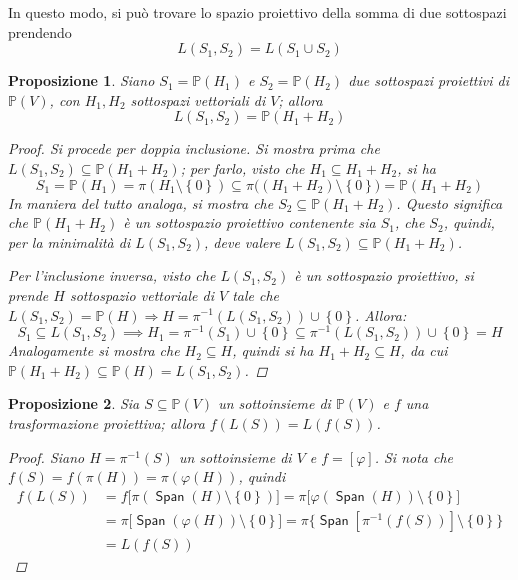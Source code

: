\documentclass[11pt, a4paper]{scrartcl}
\theoremstyle{style1}
\newtheorem{prop}{Proposizione}[section]
\numberwithin{equation}{subsection}
\renewcommand{\operatorname}[1]{\mathop{\mathrm{\textsf{#1}}}}
\begin{document}
In questo modo, si pu\`o trovare lo spazio proiettivo della somma di due sottospazi prendendo 
\begin{equation}
	L(S_1,S_2) = L(S_1\cup S_2)
\end{equation}
\begin{prop}
	Siano $S_1 = \mathbb{P}(H_1)$ e $S_2 = \mathbb{P}(H_2)$ due sottospazi proiettivi di $\mathbb{P}(V)$, con $H_1,H_2$ sottospazi vettoriali di $V$; allora
	\[
	L(S_1,S_2) = \mathbb{P}(H_1+H_2)
	\] 
	\begin{proof}
		Si procede per doppia inclusione. 
		Si mostra prima che $L(S_1,S_2) \subseteq \mathbb{P}(H_1+H_2)$; per farlo, visto che $H_1 \subseteq H_1 +H_2$, si ha
		\[
		S_1 = \mathbb{P}(H_1) = \pi(H_1\setminus\left\{ 0 \right\} ) \subseteq \pi\big((H_1+H_2) \setminus\left\{ 0 \right\} \big) = \mathbb{P}(H_1+H_2)
		\] 
		In maniera del tutto analoga, si mostra che $S_2 \subseteq \mathbb{P}(H_1+H_2)$.
		Questo significa che $\mathbb{P}(H_1+H_2)$ \`e un sottospazio proiettivo contenente sia $S_1$, che $S_2$, quindi, per la minimalit\`a di $L(S_1,S_2)$, deve valere $L(S_1,S_2) \subseteq \mathbb{P}(H_1+H_2)$.

		Per l'inclusione inversa, visto che $L(S_1,S_2)$ \`e un sottospazio proiettivo, si prende $H$ sottospazio vettoriale di $V$ tale che $L(S_1,S_2) = \mathbb{P}(H)\Rightarrow H = \pi^{-1} (L(S_1,S_2)) \cup \left\{ 0 \right\} $.
		Allora:
		\[
		S_1 \subseteq L(S_1,S_2) \implies H_1 = \pi^{-1} (S_1) \cup \left\{ 0 \right\} \subseteq \pi^{-1} (L(S_1,S_2)) \cup \left\{ 0  \right\} =H
		\] 
		Analogamente si mostra che $H_2\subseteq H$, quindi si ha $H_1+H_2 \subseteq H$, da cui $\mathbb{P}(H_1+H_2) \subseteq \mathbb{P}(H) = L(S_1,S_2)$.
	\end{proof}
\end{prop}
\begin{prop}
	Sia $S \subseteq \mathbb{P}(V)$ un sottoinsieme di $\mathbb{P}(V)$ e $f$ una trasformazione proiettiva; allora $f(L(S)) = L(f(S))$.
	\begin{proof}
		Siano $H = \pi^{-1} (S)$ un sottoinsieme di $V$ e $f = [\varphi ]$.
		Si nota che $f(S) = f(\pi(H)) = \pi(\varphi (H))$, quindi
		\[
		\begin{split}
			f(L(S)) &= f\big[\pi (\operatorname{Span} (H) \setminus \left\{ 0 \right\} )\big] = \pi\big[ \varphi (\operatorname{Span} (H)) \setminus\left\{ 0 \right\} \big]\\
				&= \pi\big[\operatorname{Span} (\varphi (H))\setminus\left\{ 0 \right\}  \big]=\pi\big\{\operatorname{Span} [\pi^{-1} (f(S))] \setminus\left\{ 0 \right\} \big\}\\
				&=L(f(S))
		\end{split}
		\] 
	\end{proof}
\end{prop}
\end{document}
